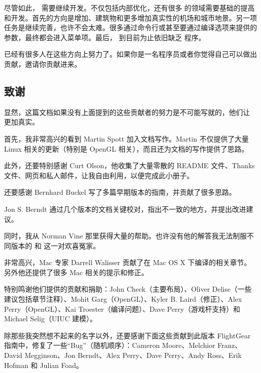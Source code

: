 尽管如此，\FlightGear{} 需要继续开发。不仅包括内部优化，还有很多 \FlightGear{} 的领域需要基础的提高和开发。首先的方向是增加、建筑物和更多增加真实性的机场和城市地景。另一项任务是继续完善，也许不会太难。很多通过命令行或甚至要通过编译选项来提供的参数，最终都会进入菜单项。最后，\FlightGear{} 到目前为止依旧缺乏  程序。

已经有很多人在这些方向上努力了。如果你是一名程序员或者你觉得自己可以做出贡献，邀请你贡献进来。

\subsection*{致谢}

显然，这篇文档如果没有上面提到的这些贡献者的努力是不可能写就的，他们让 \FlightGear{} 更加真实。

首先，我非常高兴的看到 Martin Spott 加入文档写作。Martin 不仅提供了大量 Linux 相关的更新（特别是 OpenGL 相关），而且还为文档的写作提供了思路。

此外，还要特别感谢 Curt Olson，他收集了大量零散的 README 文件、Thanks 文件、网页和私人邮件，让我自由利用，以便完成此小册子。

还要感谢 Bernhard Buckel 写了多篇早期版本的指南，并贡献了很多思路。

Jon S. Berndt 通过几个版本的文档关键校对，指出不一致的地方，并提出改进建议。

同时，我从 Norman Vine 那里获得大量的帮助。也许没有他的解答我无法制服不同版本的 \Cygwin{}和 \FlightGear{} 这一对欢喜冤家。

非常高兴，Mac 专家 Darrell Walisser  贡献了在 Mac OS X 下编译的相关章节。另外他还提供了很多 Mac 相关的提示和修正。

特别鸣谢他们提供的贡献和捐助：John Check（主要布局）、Oliver Delise（一些建议包括章节注释）、Mohit Garg（OpenGL）、Kyler B. Laird（修正）、Alex Perry（OpenGL）、Kai Troester（编译问题）、Dave Perry（游戏杆支持）和 Michael Selig（UIUC 建模）。

除那些我突然想不起来的名字以外，还要感谢下面这些贡献到此版本 FlightGear 指南中，修复了一些“Bug”（随机顺序）：Cameron Moore、Melchior Franz、David Megginson、Jon Berndt、Alex Perry、Dave Perry、Andy Ross、Erik Hofman 和 Julian Foad。

